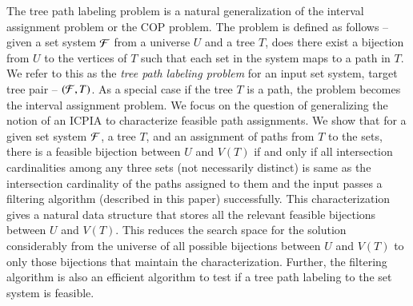 \documentclass[MS,synopsis]{iitmdiss}
\def \un {\bf 1}
\begin{document}
The tree path labeling problem is a natural generalization of the
interval assignment problem or the COP problem. The problem is defined
as follows -- given a set system ${\cal F}$ from a universe $U$ and a tree
$T$, does there exist a bijection from $U$ to the vertices of $T$ such
that each set in the system maps to a path in $T$.  We refer to this
as the {\em tree path labeling problem} for an input set system,
target tree pair -- $({\cal F},T)$. As a special case if the tree $T$ is a
path, the problem becomes the interval assignment problem.  We focus
on the question of generalizing the notion of an ICPIA \cite{nsnrs09}
to characterize feasible path assignments.  We show that for a given
set system ${\cal F}$, a tree $T$, and an assignment of paths from $T$ to
the sets, there is a feasible bijection between $U$ and $V(T)$ if and
only if all intersection cardinalities among any three sets (not
necessarily distinct) is same as the intersection cardinality of the
paths assigned to them and the input passes a filtering algorithm
(described in this paper) successfully.  This characterization gives a
natural data structure that stores all the relevant feasible
bijections between $U$ and $V(T)$. This reduces the search space for
the solution considerably from the universe of all possible bijections
between $U$ and $V(T)$ to only those bijections that maintain the
characterization.  Further, the filtering algorithm
is also an efficient algorithm to test if a tree path labeling to the
set system is
feasible.  %




\def \probdefwidth {0.85\linewidth}
\def \FTPL {{\sc Feasbile Tree Path Labeling}}
\def \CFTPL {\sc Compute Feasible Path Labeling} 
\end{document}
